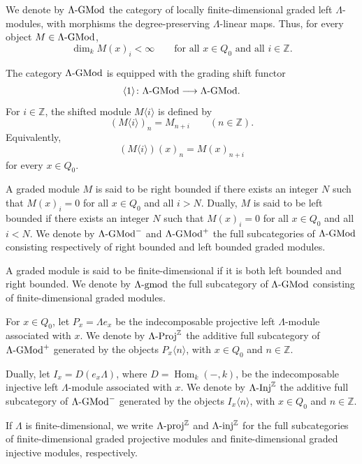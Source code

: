 \documentclass[11pt]{article}
\theoremstyle{definition}
\theoremstyle{remark}
\begin{document}
We denote by \(\Lambda\textup{-GMod}\) the category of locally
finite-dimensional graded left \(\Lambda\)-modules, with morphisms the
degree-preserving \(\Lambda\)-linear maps. Thus, for every object
\(M\in\Lambda\textup{-GMod}\),
\[
\dim_k M(x)_i<\infty
\qquad
\text{for all }x\in Q_0\text{ and all }i\in\mathbb{Z}.
\]

The category \(\Lambda\textup{-GMod}\) is equipped with the grading shift
functor
\[
\langle 1\rangle\colon
\Lambda\textup{-GMod}\longrightarrow\Lambda\textup{-GMod}.
\]
For \(i\in\mathbb{Z}\), the shifted module \(M\langle i\rangle\) is defined by
\[
(M\langle i\rangle)_n=M_{n+i}
\qquad
(n\in\mathbb{Z}).
\]
Equivalently,
\[
(M\langle i\rangle)(x)_n=M(x)_{n+i}
\]
for every \(x\in Q_0\).

A graded module \(M\) is said to be right bounded if there exists an integer
\(N\) such that \(M(x)_i=0\) for all \(x\in Q_0\) and all \(i>N\). Dually,
\(M\) is said to be left bounded if there exists an integer \(N\) such that
\(M(x)_i=0\) for all \(x\in Q_0\) and all \(i<N\). We denote by \(\Lambda\textup{-GMod}^{-}\) and
\(\Lambda\textup{-GMod}^{+}\) the full subcategories of
\(\Lambda\textup{-GMod}\) consisting respectively of right bounded and left
bounded graded modules.

A graded module is said to be finite-dimensional if it is both left bounded and
right bounded. We denote by \(\Lambda\textup{-gmod}\) the full subcategory of
\(\Lambda\textup{-GMod}\) consisting of finite-dimensional graded modules.

For \(x\in Q_0\), let \(P_x=\Lambda e_x\) be the indecomposable projective left
\(\Lambda\)-module associated with \(x\). We denote by
\(\Lambda\textup{-Proj}^{\mathbb Z}\) the additive full subcategory of
\(\Lambda\textup{-GMod}^{+}\) generated by the objects
\(P_x\langle n\rangle\), with \(x\in Q_0\) and \(n\in\mathbb Z\).

Dually, let \(I_x=D(e_x\Lambda)\), where \(D=\operatorname{Hom}_k(-,k)\), be
the indecomposable injective left \(\Lambda\)-module associated with \(x\). We
denote by \(\Lambda\textup{-Inj}^{\mathbb Z}\) the additive full subcategory of
\(\Lambda\textup{-GMod}^{-}\) generated by the objects
\(I_x\langle n\rangle\), with \(x\in Q_0\) and \(n\in\mathbb Z\).

If \(\Lambda\) is finite-dimensional, we write
\(\Lambda\textup{-proj}^{\mathbb Z}\) and
\(\Lambda\textup{-inj}^{\mathbb Z}\) for the full subcategories of
finite-dimensional graded projective modules and finite-dimensional graded
injective modules, respectively.
\end{document}
